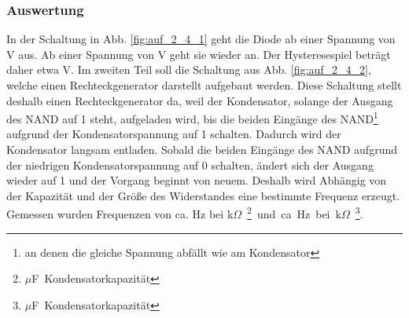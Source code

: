 \documentclass[12pt,a4paper]{article}
\begin{document}
\subsubsection*{Auswertung}
In der Schaltung in Abb. \ref{fig:auf_2_4_1} geht die Diode ab einer Spannung von \unit[3]{V} aus. Ab einer Spannung von \unit[2,3]{V} geht sie wieder an. Der Hysteresespiel beträgt daher etwa \unit[0,7]{V}.\newline
Im zweiten Teil soll die Schaltung aus Abb. \ref{fig:auf_2_4_2}, welche einen Rechteckgenerator darstellt aufgebaut werden. Diese Schaltung stellt deshalb einen Rechteckgenerator da, weil der Kondensator, solange der Ausgang des NAND auf 1 steht, aufgeladen wird, bis die beiden Eingänge des NAND\footnote{an denen die gleiche Spannung abfällt wie am Kondensator} aufgrund der Kondensatorspannung auf 1 schalten. Dadurch wird der Kondensator langsam entladen. Sobald die beiden Eingänge des NAND aufgrund der niedrigen Kondensatorspannung auf 0 schalten, ändert sich der Ausgang wieder auf 1 und der Vorgang beginnt von neuem. Deshalb wird Abhängig von der Kapazität und der Größe des Widerstandes eine bestimmte Frequenz erzeugt. Gemessen wurden Frequenzen von ca. \unit[1,8]{Hz} bei \unit[80,6]{k$\Omega$} \footnote{\unit[10]{$\mu$F} Kondensatorkapazität} und ca. \unit[0,18]{Hz} bei \unit[40,2]{k$\Omega$} \footnote{\unit[100]{$\mu$F} Kondensatorkapazität}.
\end{document}
